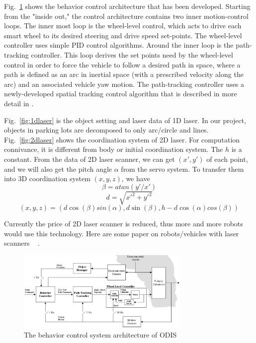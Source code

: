 \documentclass{cdcarta4}
\begin{document}
Fig.~\ref{odis1blk} shows the behavior control architecture that has been developed. 
Starting from the "inside out," the control architecture contains two inner motion-control loops. The inner most loop is the wheel-level control, which acts to drive each smart wheel to its desired steering and drive speed set-points. The wheel-level controller uses simple PID control algorithms. Around the inner loop is the path-tracking controller. This loop derives the set points need by the wheel-level control in order to force the vehicle to follow a desired path in space, where a path is defined as an arc in inertial space (with a prescribed velocity along the arc) and an  associated vehicle yaw motion. The path-tracking controller 
uses a newly-developed spatial tracking control algorithm that is described in more detail in  \cite{odis_icra01}. 


Fig.~\ref{fig:1dlaser} is the object setting and laser data of 1D laser. In our project, 
objects in parking lots are decomposed to only arc/circle and lines. Fig.~\ref{fig:2dlaser}
shows the coordination system of 2D laser. For computation connivance, it is different from 
body or initial coordination system. The $h$ is a constant. From the data of 2D laser scanner, we can get $(x',y')$ of each point, and we will also get the pitch angle $\alpha$ from the servo system. To transfer them into 3D coordination system $(x,y,z)$, we have
$$ \beta=atan(y'/x') $$
$$ d = \sqrt{x'^2 + y'^2} $$
$$ (x,y,z)=(d \cos(\beta)sin(\alpha), d \sin(\beta), h-d \cos(\alpha)cos(\beta) ) $$

Currently the price of 2D laser scanner is reduced, thus more and more robots would use this technology. Here are some paper on robots/vehicles with laser scanners ~\cite{Dedieu00Mixed} \cite{Hartmart2001ISR} \cite{Taylor1996}  \cite{Vandorpe1996} \cite{Cadenat2000} \cite{Laurent1997} \cite{Borenstein96WhereAmI}.

\begin{figure}[!htb]
\center
\includegraphics[width=8.3cm]{img/odis1blk}
\caption{The behavior control system architecture of ODIS} 
\label{odis1blk}
\end{figure} 
\end{document}
